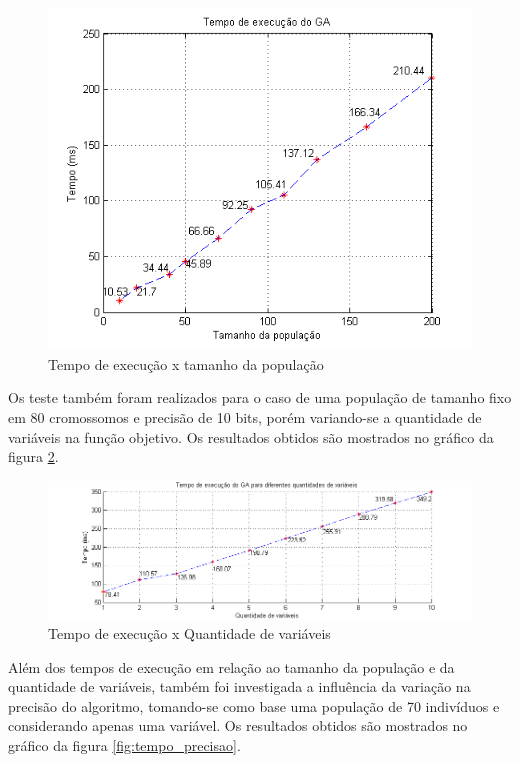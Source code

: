 \documentclass[
    12pt,               %
    oneside,%
    a4paper,            %
    english,            %
    french,             %
    spanish,            %
    brazil,             %
    ]{abntex2}
\begin{document}
    \begin{figure}[tb]
	\centering 
	\includegraphics[width=1.0\columnwidth]{images/1_var_prec_10_sizepop_x_t} 
	\caption[Tempo de execução x Tamanho da população]{Tempo de execução x tamanho da população}
	\label{fig:populacao_tempo} 
	\end{figure}

  Os teste também foram realizados para o caso de uma população de tamanho fixo em 80 cromossomos e precisão de 10 bits, porém variando-se a quantidade de variáveis na função objetivo. Os resultados obtidos são mostrados no gráfico da figura \ref{fig:qtdvar_tempo}.

  	\begin{figure}[tb]
	\centering 
	\includegraphics[width=1.0\columnwidth]{images/N_variaveis} 
	\caption[Tempo de execução x Quantidade de variáveis]{Tempo de execução x Quantidade de variáveis}
	\label{fig:qtdvar_tempo} 
	\end{figure}

  Além dos tempos de execução em relação ao tamanho da população e da quantidade de variáveis, também foi investigada a influência da variação na precisão do algoritmo, tomando-se como base uma população de 70 indivíduos e considerando apenas uma variável. Os resultados obtidos são mostrados no gráfico da figura \ref{fig:tempo_precisao}.
\end{document}
